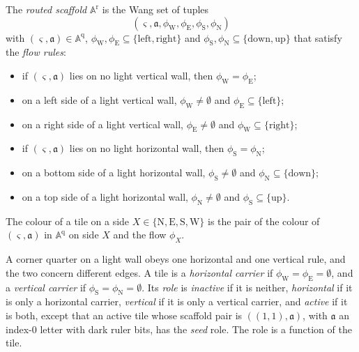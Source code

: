 \begin{definition}\label{fam:def-routed}
The \emph{routed scaffold} $\mathbb A^{\mathrm r}$ is the Wang set of tuples
\[
(\varsigma,\mathfrak a,\phi_{\mathrm W},\phi_{\mathrm E},\phi_{\mathrm S},\phi_{\mathrm N})
\]
with $(\varsigma,\mathfrak a)\in\mathbb A^{\mathrm q}$, $\phi_{\mathrm W},\phi_{\mathrm E}\subseteq\{\mathrm{left},\mathrm{right}\}$ and $\phi_{\mathrm S},\phi_{\mathrm N}\subseteq\{\mathrm{down},\mathrm{up}\}$ that satisfy the \emph{flow rules}:
\begin{itemize}
\item[(F1)] if $(\varsigma,\mathfrak a)$ lies on no light vertical wall, then $\phi_{\mathrm W}=\phi_{\mathrm E}$;
\item[(F2)] on a left side of a light vertical wall, $\phi_{\mathrm W}\ne\emptyset$ and $\phi_{\mathrm E}\subseteq\{\mathrm{left}\}$;
\item[(F3)] on a right side of a light vertical wall, $\phi_{\mathrm E}\ne\emptyset$ and $\phi_{\mathrm W}\subseteq\{\mathrm{right}\}$;
\item[(F4)] if $(\varsigma,\mathfrak a)$ lies on no light horizontal wall, then $\phi_{\mathrm S}=\phi_{\mathrm N}$;
\item[(F5)] on a bottom side of a light horizontal wall, $\phi_{\mathrm S}\ne\emptyset$ and $\phi_{\mathrm N}\subseteq\{\mathrm{down}\}$;
\item[(F6)] on a top side of a light horizontal wall, $\phi_{\mathrm N}\ne\emptyset$ and $\phi_{\mathrm S}\subseteq\{\mathrm{up}\}$.
\end{itemize}
The colour of a tile on a side $X\in\{\mathrm N,\mathrm E,\mathrm S,\mathrm W\}$ is the pair of the colour of $(\varsigma,\mathfrak a)$ in $\mathbb A^{\mathrm q}$ on side $X$ and the flow $\phi_X$.
\end{definition}

A corner quarter on a light wall obeys one horizontal and one vertical rule, and the two concern different edges. A tile is a \emph{horizontal carrier} if $\phi_{\mathrm W}=\phi_{\mathrm E}=\emptyset$, and a \emph{vertical carrier} if $\phi_{\mathrm S}=\phi_{\mathrm N}=\emptyset$. Its \emph{role} is \emph{inactive} if it is neither, \emph{horizontal} if it is only a horizontal carrier, \emph{vertical} if it is only a vertical carrier, and \emph{active} if it is both, except that an active tile whose scaffold pair is $((1,1),\mathfrak a)$, with $\mathfrak a$ an index-$0$ letter with dark ruler bits, has the \emph{seed} role. The role is a function of the tile.

